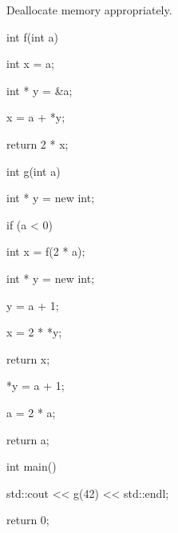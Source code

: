 Deallocate memory appropriately.



\begin{consolethree}[escapeinside=||]

int f(int a)

{

    int x = a;

    int * y = &a;

    x = a + *y;

    return 2 * x;

}



int g(int a)

{



   int * y = new int;

   if (a < 0)

   {

        int x = f(2 * a);

        int * y = new int;

        y = a + 1;

        x = 2 * *y;

        return x;

    }

    *y = a + 1;

    a = 2 * a;

    return a;

}



int main()

{

    std::cout << g(42) << std::endl;

    return 0;

}

\end{consolethree}

